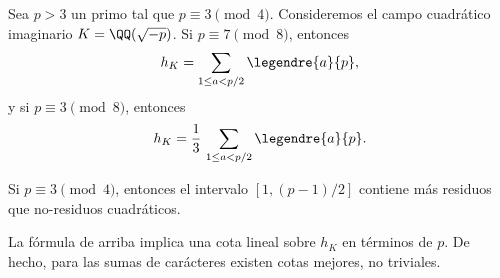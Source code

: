 \begin{teorema}[Dirichlet]
  Sea $p > 3$ un primo tal que $p \equiv 3 \pmod{4}$. Consideremos el campo
  cuadrático imaginario $K = \QQ (\sqrt{-p})$. Si $p \equiv 7 \pmod{8}$,
  entonces
  $$h_K = \sum_{1 \le a < p/2} \legendre{a}{p},$$
  y si $p \equiv 3 \pmod{8}$, entonces
  $$h_K = \frac{1}{3}\,\sum_{1 \le a < p/2} \legendre{a}{p}.$$
\end{teorema}

\begin{corolario}
  Si $p \equiv 3 \pmod{4}$, entonces el intervalo $[1, (p-1)/2]$ contiene más
  residuos que no-residuos cuadráticos.
\end{corolario}

La fórmula de arriba implica una cota lineal sobre $h_K$ en términos de $p$.
De hecho, para las sumas de carácteres existen cotas mejores, no triviales.

